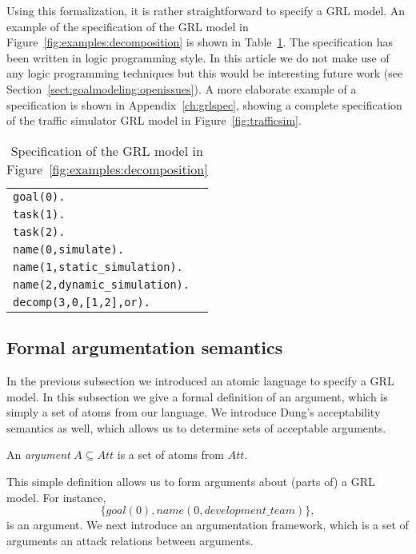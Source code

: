 Using this formalization, it is rather straightforward to specify a GRL model. An example of the specification of the GRL model in Figure~\ref{fig:examples:decomposition} is shown in Table~\ref{table:grl_atom_spec}. The specification has been written in logic programming style. In this article we do not make use of any logic programming techniques but this would be interesting future work (see Section~\ref{sect:goalmodeling:openissues}). A more elaborate example of a specification is shown in Appendix~\ref{ch:grlspec}, showing a complete specification of the traffic simulator GRL model in Figure~\ref{fig:trafficsim}.

\begin{table}[h!]
\centering
\begin{tabularx}{0.4\textwidth}{|X|}
\hline
\texttt{goal(0).}\\
\texttt{task(1).}\\
\texttt{task(2).}\\
\texttt{name(0,simulate).}\\
\texttt{name(1,static\_simulation).}\\
\texttt{name(2,dynamic\_simulation).}\\
\texttt{decomp(3,0,[1,2],or).}\\
\hline
\end{tabularx}
\caption{Specification of the GRL model in Figure~\ref{fig:examples:decomposition}}
\label{table:grl_atom_spec}
\end{table}

\subsection{Formal argumentation semantics}
\label{sect:goalmodeling:argumentationsemantics}

In the previous subsection we introduced an atomic language to specify a GRL model. In this subsection we give a formal definition of an argument, which is simply a set of atoms from our language. We introduce Dung's acceptability semantics as well, which allows us to determine sets of acceptable arguments.

\begin{definition}[Argument]
An \emph{argument} $A\subseteq Att$ is a set of atoms from $Att$.
\end{definition}

This simple definition allows us to form arguments about (parts of) a GRL model. For instance, $$\{goal(0),name(0,development\_team)\},$$ is an argument. We next introduce an argumentation framework, which is a set of arguments an attack relations between arguments.

